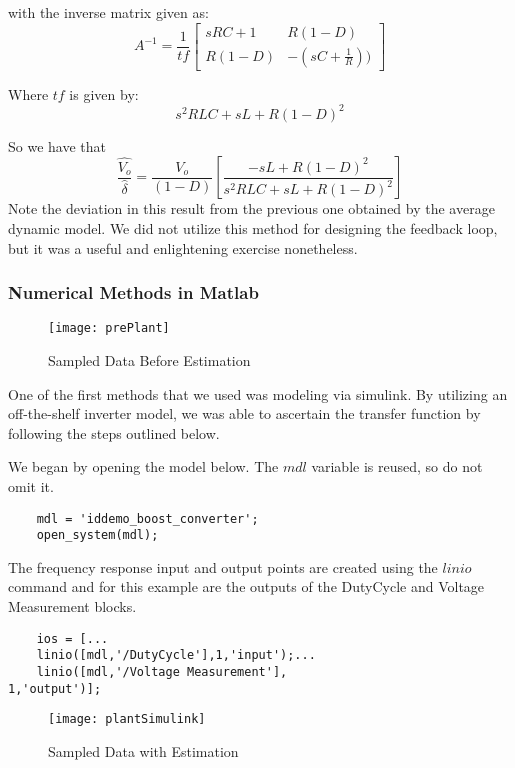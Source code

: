 with the inverse matrix given as:
\begin{equation}
A^{-1} = \frac{1}{tf}\begin{bmatrix}
sRC + 1 & R(1-D) \\ 
R(1-D) & -(sC+\frac{1}{R})) 
\end{bmatrix}
\end{equation}

Where $tf$ is given by:
\begin{equation}
s^2RLC + sL + R(1-D)^2
\end{equation}

So we have that 
\begin{equation}
\frac{\hat{V_o}}{\hat{\delta}} = \frac{V_o}{(1-D)}[\frac{-sL + R(1-D)^2}{s^2RLC + sL + R(1-D)^2}]
\end{equation}
Note the deviation in this result from the previous one obtained by the average dynamic model. We did not utilize this method for designing the feedback loop, but it was a useful and enlightening exercise nonetheless.

\subsubsection{Numerical Methods in Matlab}
\begin{figure}[htbp]
\begin{center}
\texttt{[image: prePlant]}
\caption{Sampled Data Before Estimation}
\label{prePlant}
\end{center}
\end{figure}
One of the first methods that we used was modeling via simulink. By utilizing an off-the-shelf inverter model, we was able to ascertain the transfer function by following the steps outlined below. 

We began by opening the model below. The $mdl$ variable is reused, so do not omit it.
\begin{verbatim}
	mdl = 'iddemo_boost_converter';
	open_system(mdl);
\end{verbatim}
The frequency response input and output points are created using the $linio$ command and for this example are the outputs of the DutyCycle and Voltage Measurement blocks.
\begin{verbatim}
	ios = [...
	linio([mdl,'/DutyCycle'],1,'input');...
	linio([mdl,'/Voltage Measurement'],
1,'output')];
\end{verbatim}

\begin{figure}[htbp]
\begin{center}
\texttt{[image: plantSimulink]}
\caption{Sampled Data with Estimation}
\label{plantSimulink}
\end{center}
\end{figure}

